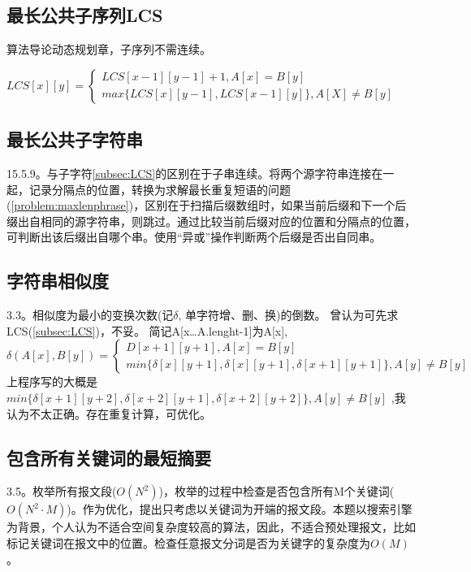 \subsection{最长公共子序列LCS}
算法导论动态规划章，子序列不需连续。

$LCS[x][y]= \left\{ \begin{array}{l} LCS[x-1][y-1]+1, A[x]=B[y] \\ max\{LCS[x][y-1], LCS[x-1][y]\}, A[X] \ne B[y] \end{array}  \right. $

\label{subsec:LCS}

\subsection{最长公共子字符串}
\cite{pp}15.5.9。与子字符\ref{subsec:LCS}的区别在于子串连续。将两个源字符串连接在一起，记录分隔点的位置，转换为求解最长重复短语的问题(\ref{problem:maxlenphrase})，区别在于扫描后缀数组时，如果当前后缀和下一个后缀出自相同的源字符串，则跳过。通过比较当前后缀对应的位置和分隔点的位置，可判断出该后缀出自哪个串。使用``异或''操作判断两个后缀是否出自同串。


\subsection{字符串相似度}
\cite{bop}3.3。相似度为最小的变换次数(记$\delta$, 单字符增、删、换)的倒数。
曾认为可先求LCS(\ref{subsec:LCS})，不妥。 简记A[x\ldots A.lenght-1]为A[x], 
\begin{displaymath}
   \delta(A[x], B[y])=
   \left\{
   \begin{array}{l}
       D[x+1][y+1], A[x]=B[y] \\ 
       min\{\delta[x][y+1], \delta[x][y+1], \delta[x+1][y+1] \}, A[y] \ne B[y]
   \end{array} 
    \right.
\end{displaymath}
\cite{bop}上程序写的大概是
\begin{math}
       min\{\delta[x+1][y+2], \delta[x+2][y+1], \delta[x+2][y+2] \}, A[y] \ne B[y]
\end{math}
,我认为不太正确。存在重复计算，可优化。

\subsection{包含所有关键词的最短摘要}
\cite{bop}3.5。枚举所有报文段($O(N^2)$)，枚举的过程中检查是否包含所有M个关键词($O(N^{2} \cdot M)$)。作为优化，\cite{bop}提出只考虑以关键词为开端的报文段。本题以搜索引擎为背景，个人认为不适合空间复杂度较高的算法，因此，不适合预处理报文，比如标记关键词在报文中的位置。检查任意报文分词是否为关键字的复杂度为$O(M)$。


